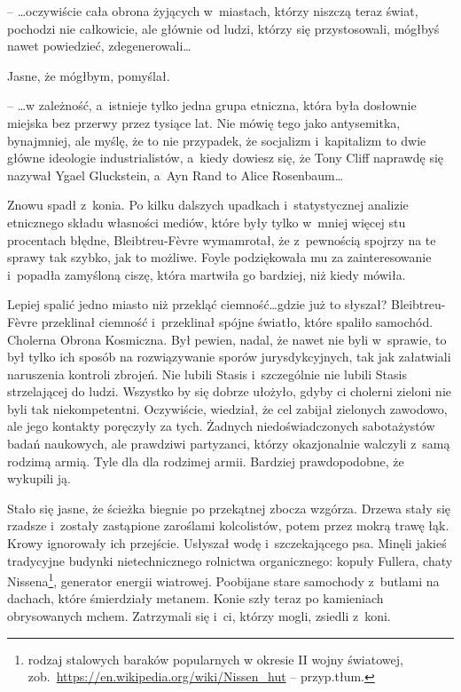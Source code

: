 \documentclass[oneside,polish,11pt,sfheadings]{mwbk}
\begin{document}
-- \ldots oczywiście cała obrona żyjących w~miastach, którzy niszczą teraz
świat, pochodzi nie całkowicie, ale głównie od ludzi, którzy się
przystosowali, mógłbyś nawet powiedzieć, zdegenerowali\ldots

Jasne, że mógłbym, pomyślał.

-- \ldots w zależność, a~istnieje tylko jedna grupa etniczna, która była
dosłownie miejska bez przerwy przez tysiące lat. Nie mówię tego jako
antysemitka, bynajmniej, ale myślę, że to nie przypadek, że socjalizm i~kapitalizm to dwie główne ideologie industrialistów, a~kiedy dowiesz
się, że Tony Cliff naprawdę się nazywał Ygael Gluckstein, a~Ayn Rand to
Alice Rosenbaum\ldots

Znowu spadł z~konia. Po kilku dalszych upadkach i~statystycznej analizie
etnicznego składu własności mediów, które były tylko w~mniej więcej stu
procentach błędne, Bleibtreu-Fèvre wymamrotał, że z~pewnością spojrzy na
te sprawy tak szybko, jak to możliwe. Foyle podziękowała mu za
zainteresowanie i~popadła zamyśloną ciszę, która martwiła go bardziej,
niż kiedy mówiła.

Lepiej spalić jedno miasto niż przekląć ciemność\ldots gdzie już to
słyszał? Bleibtreu-Fèvre przeklinał ciemność i~przeklinał spójne
światło, które spaliło samochód. Cholerna Obrona Kosmiczna. Był pewien,
nadal, że nawet nie byli w~sprawie, to był tylko ich sposób na
rozwiązywanie sporów jurysdykcyjnych, tak jak załatwiali naruszenia
kontroli zbrojeń. Nie lubili Stasis i~szczególnie nie lubili Stasis
strzelającej do ludzi. Wszystko by się dobrze ułożyło, gdyby ci cholerni
zieloni nie byli tak niekompetentni. Oczywiście, wiedział, że cel
zabijał zielonych zawodowo, ale jego kontakty poręczyły za tych. Żadnych
niedoświadczonych sabotażystów badań naukowych, ale prawdziwi
partyzanci, którzy okazjonalnie walczyli z~samą rodzimą armią. Tyle dla
dla rodzimej armii. Bardziej prawdopodobne, że wykupili ją.

Stało się jasne, że ścieżka biegnie po przekątnej zbocza wzgórza. Drzewa
stały się rzadsze i~zostały zastąpione zaroślami kolcolistów, potem
przez mokrą trawę łąk. Krowy ignorowały ich przejście. Usłyszał wodę i~szczekającego psa. Minęli jakieś tradycyjne budynki nietechnicznego
rolnictwa organicznego: kopuły Fullera, chaty Nissena\footnote{rodzaj
stalowych baraków popularnych w okresie II wojny światowej,
zob.~\url{https://en.wikipedia.org/wiki/Nissen\_hut} -- przyp.tłum.}, generator energii wiatrowej. Poobijane stare samochody z~butlami na dachach, które śmierdziały metanem. Konie szły teraz po
kamieniach obrysowanych mchem. Zatrzymali się i~ci, którzy mogli,
zsiedli z~koni.
\end{document}
